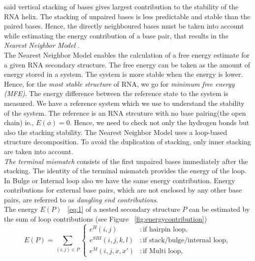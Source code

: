 \documentclass[twoside,a4paper]{report}
\numberwithin{equation}{section}
\begin{document}
 	 \citet{DeVoe1962TheSO} said vertical stacking of bases gives largest contribution to the stability of the RNA helix. The stacking of unpaired bases is less predictable and stable than the paired bases. Hence, the directly neighboured bases must be taken into account while estimating the energy contribution of a  base pair, that results in the \textit{Nearest Neighbor Model} \citep{borer1974stability}.\\
 	 
 	 The Nearest Neighbor Model enables the calculation of a free energy estimate for a given RNA secondary structure. The free energy can be taken as the amount of energy stored in a system. The system is more stable when the energy is lower. Hence, for the \textit{most stable structure} of RNA, we go for \textit{minimum free energy (MFE)}. The energy difference between the reference state to the system is measured. We have a reference system which we use to understand the stability of the system. The reference is an RNA strcuture with no base pairing(the open chain) ie., $ E(\phi) =0 $. Hence, we need to check not only the hydrogen bonds but also the stacking stability. The Nearest Neighbor Model uses a loop-based structure decomposition. To avoid the duplication of stacking, only inner stacking are taken into account. \\
 	 
 	 \textit{The terminal mismatch} consists of the first unpaired bases immediately after the stacking. The identity of the terminal mismatch provides the energy of the loop. In Bulge or Internal loop also we have the same energy contribution. Energy contributions for external base pairs, which are not enclosed by any other base pairs, are referred to as \textit{dangling end contributions}.\\ 
 	 The energy $E(P)$ ~\ref{eq:1} of a nested secondary structure $P$ can be estimated by the sum of loop contributions (see Figure ~\ref{fig:energycontribution})\\
 	 
 	 \begin{equation}
 	 \label{eq:1}
 	 E(P) = \sum_{(i,j) \in P} \begin{cases}
 	 e^H(i,j) & : \text{if hairpin loop}, \\
 	 e^{SBI}(i,j,k,l) & : \text{if stack/bulge/internal loop} ,\\
 	 e^M(i,j,x,x') & : \text{if Multi loop},
 	 \end{cases}
 	 \end{equation}
 	 
\end{document}
